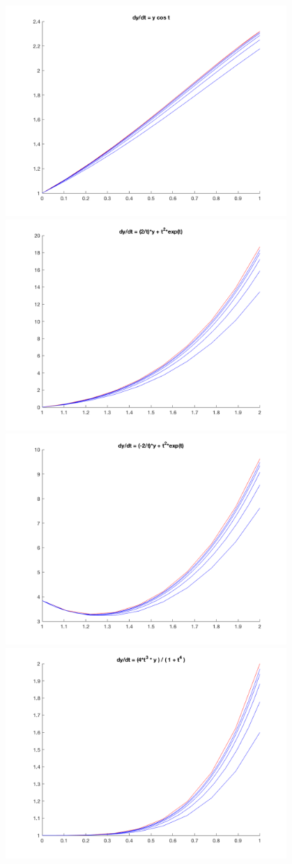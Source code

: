\documentclass{article}
\begin{document}
\includegraphics[height=8cm]{partc_1}\\
\includegraphics[height=8cm]{partc_2}\\
\includegraphics[height=8cm]{partc_3}\\
\includegraphics[height=8cm]{partc_4}\\
\end{document}
